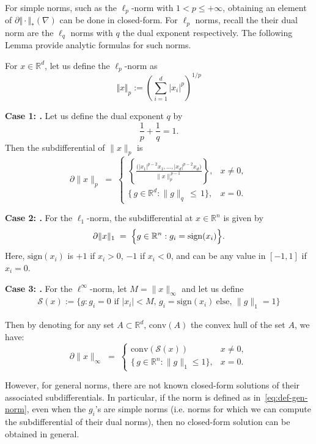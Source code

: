 For simple norms, such as the $\ell_p$-norm with $1< p\leq +\infty$, obtaining an element of $\partial\Vert \cdot\Vert_{*}(\nabla)$ can be done in closed-form. For $\ell_p$ norms, recall the their dual norm are the $\ell_q$ norms with $q$ the dual exponent respectively. The following Lemma provide analytic formulas for such norms. 

\begin{lemma}
For $x\in\mathbb{R}^d$, let us define the $\ell_p$-norm as 
$$\Vert x\Vert_p:=\left(\sum_{i=1}^d |x_i|^p\right)^{1/p}$$

\textbf{Case 1: .}
Let us define the dual exponent $q$ by
\[
\frac{1}{p} + \frac{1}{q} = 1.
\]
Then the subdifferential of $\|x\|_p$ is
\[
\partial \|x\|_p \;=\;
\begin{cases}
\displaystyle
\left\{
  \frac{\bigl(|x_1|^{p-2}x_1,\dots,|x_d|^{p-2}x_d\bigr)}{\|x\|_p^{\,p-1}}
\right\}, 
& x \neq 0,
\\
\bigl\{\,g \in \mathbb{R}^d : \|g\|_q \,\le\, 1 \bigr\}, 
& x = 0.
\end{cases}
\]

\textbf{Case 2: .}
For the $\ell_1$-norm, the subdifferential at $x \in \mathbb{R}^n$ is given by
\[
\partial \|x\|_1 
\;=\;
\Bigl\{
   g \in \mathbb{R}^n : 
   g_i = \mathrm{sign}(x_i)
\Bigr\}.
\]
Here, $\mathrm{sign}(x_i)$ is $+1$ if $x_i > 0$, $-1$ if $x_i < 0$, and can be any value in $[-1,1]$ if $x_i=0$.

\textbf{Case 3: .}  
For the $\ell^\infty$-norm, let $M = \|x\|_\infty$ and let us define
\begin{align*}
\mathcal{S}(x):=\{
  g: 
  g_i=0 \text{ if } |x_i|<M,\,
  g_i = \mathrm{sign}(x_i)~\text{else},\,
  \|g\|_1 = 1
\}
\end{align*}

Then by denoting for any set $A\subset\mathbb{R}^d$, $\text{conv}(A)$ the convex hull of the set $A$, we have:
\[
\partial \|x\|_\infty
\;=\;
\begin{cases}
\displaystyle
\mathrm{conv}\!(\mathcal{S}(x))
& x \neq 0,
\\
\bigl\{\, g \in \mathbb{R}^n : \|g\|_1 \le 1 \bigr\},
& x = 0.
\end{cases}
\]
\end{lemma}

However, for general norms, there are not known closed-form solutions of their associated subdifferentials. In particular, if the norm is defined as in~\eqref{eq:def-gen-norm}, even when the $g_i$'s are simple norms (i.e. norms for which we can compute the subdifferential of their dual norms), then no closed-form solution can be obtained in general.  



